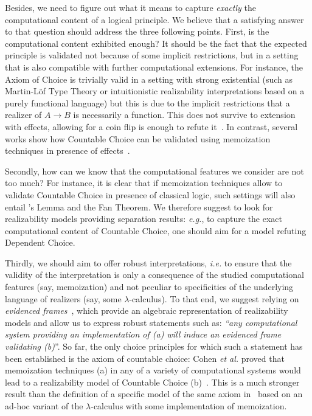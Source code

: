 \documentclass{easychair}
\begin{document}
Besides, we need to figure out what it means to  capture \emph{exactly} the computational content of a logical principle. We believe that a satisfying answer to that question should address the three following points.
First, is the computational content exhibited enough? It should be the fact that the expected principle is validated not because of some implicit restrictions, but in a setting that is also compatible with further computational extensions.
For instance, the Axiom of Choice is trivially valid in a setting with strong existential (such as Martin-Löf Type Theory or intuitionistic realizability interpretations based on a purely functional language) but this is due to the implicit restrictions that a realizer of $A\to B$ is necessarily a function. This does not survive to extension with effects, allowing for a coin flip is enough to refute it~\cite{CohFarTat19}. In contrast, several works show how Countable Choice can be validated using memoization techniques in presence of effects~\cite{BerBezCoq98,Herbelin12,Miquey18a,CohFarTat19}.

Secondly, how can we know that the computational features we consider are not too much? For instance, it is clear that if memoization techniques allow to validate Countable Choice in presence of classical logic, such settings will also entail \Konig's Lemma and the Fan Theorem. We therefore suggest to look for realizability models providing separation results: \emph{e.g.}, to capture the exact computational content of Countable Choice, one should aim for a model refuting Dependent Choice.

Thirdly, we should aim to offer robust interpretations, \emph{i.e.} to ensure that the validity of the interpretation is only a consequence of the studied computational features (say, memoization) and not peculiar to specificities of the underlying language of realizers (say, some $\lambda$-calculus). To that end, we suggest relying on \emph{evidenced frames}~\cite{CohMiqTat21}, which provide an algebraic representation of realizability models and allow us to express robust statements such as:
\emph{``any computational system providing an implementation of \emph{(a)} will induce an evidenced frame validating \emph{(b)}}''. So far, the only choice principles for which such a statement has been established is the axiom of countable choice: Cohen \emph{et al.} proved that memoization techniques (a) in any of a variety of computational systems would lead to a realizability model of Countable Choice (b)~\cite{CohFarTat19,CohMiqTat21}. This is a much stronger result than the definition of a specific model of the same axiom in~\cite{Herbelin12,Miquey18a} based on an ad-hoc variant of the $\lambda$-calculus with some implementation of memoization.
\end{document}
